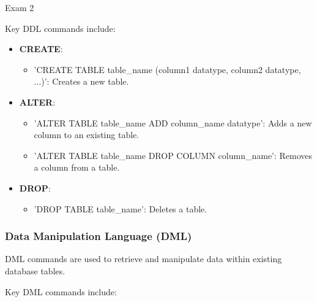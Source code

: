 \begin{examnotes}{Exam 2}
    \begin{highlight}
        Key DDL commands include:
        
        \begin{itemize}
            \item \textbf{CREATE}:
                \begin{itemize}
                    \item 'CREATE TABLE table\_name (column1 datatype, column2 datatype, ...)': Creates a new table.
                \end{itemize}
            \item \textbf{ALTER}:
                \begin{itemize}
                    \item 'ALTER TABLE table\_name ADD column\_name datatype': Adds a new column to an existing table.
                    \item 'ALTER TABLE table\_name DROP COLUMN column\_name': Removes a column from a table.
                \end{itemize}
            \item \textbf{DROP}:
                \begin{itemize}
                    \item 'DROP TABLE table\_name': Deletes a table.
                \end{itemize}
        \end{itemize}
    \end{highlight}
    
    \subsubsection*{Data Manipulation Language (DML)}
    
    DML commands are used to retrieve and manipulate data within existing database tables.
    
    \begin{highlight}
        Key DML commands include:
        

\end{highlight}
\end{examnotes}
